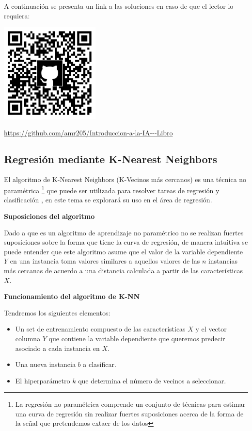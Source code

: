 \documentclass[11pt,fleqn]{book} %
\begin{document}
A continuación se presenta un link a las soluciones en caso de que el lector lo requiera:

\includegraphics[width=5cm]{Pictures/github/libro-ia.png}

\url{https://github.com/amr205/Introduccion-a-la-IA---Libro}

\clearpage

\subsection{Regresión mediante K-Nearest Neighbors}  \label{subsection:knn}

El algoritmo de K-Nearest Neighbors (K-Vecinos más cercanos) es una técnica no paramétrica \footnote{La regresión no paramétrica comprende un conjunto de técnicas para estimar una curva de regresión sin realizar fuertes suposiciones acerca de la forma de la señal que pretendemos extaer de los datos} que puede ser utilizada para resolver tareas de regresión y clasificación \cite{knn_intro}, en este tema se explorará su uso en el área de regresión.

\textbf{Suposiciones del algoritmo}

Dado a que es un algoritmo de aprendizaje no paramétrico no se realizan fuertes suposiciones sobre la forma que tiene la curva de regresión, de manera intuitiva se puede entender que este algoritmo asume que el valor de la variable dependiente $Y$ en una instancia toma valores similares a aquellos valores de las $n$ instancias más cercanas de acuerdo a una distancia calculada a partir de las características $X$.

\textbf{Funcionamiento del algoritmo de K-NN}

Tendremos los siguientes elementos:

\begin{itemize}
\item  Un set de entrenamiento compuesto de las características $X$ y el vector columna $Y$ que contiene la variable dependiente que queremos predecir asociado a cada instancia en $X$.
\item Una nueva instancia $b$ a clasificar.
\item El hiperparámetro $k$ que determina el número de vecinos a seleccionar.
\end{itemize}
\end{document}
